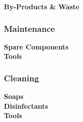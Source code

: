 \textbf{By-Products \& Waste}\\


\subsubsection{Maintenance}

\textbf{Spare Components}\\


\textbf{Tools}\\


\subsubsection{Cleaning}

\textbf{Soaps}\\


\textbf{Disinfectants}\\


\textbf{Tools}\\

